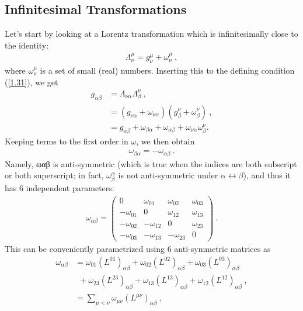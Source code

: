 \documentclass[12pt,a4paper]{report}
\begin{document}
\subsection{ Infinitesimal Transformations}
Let’s start by looking at a Lorentz transformation \cite{Hitoshi, Ryder} which is infinitesimally close to the
identity:
\begin{align}
    \Lambda^\mu_\nu=g^\mu_\nu+\omega^\mu_\nu\label{1.80}~,
\end{align}
where $\omega^\mu_\nu$ is a set of small (real) numbers. Inserting this to the defining condition (\eqref{1.31}), we get
\begin{align}
    g_{\alpha\beta}&=\Lambda_{\nu\alpha}\Lambda^\nu_\beta~,\\
    &=(g_{\nu\alpha}+\omega_{\nu\alpha})(g^\nu_\beta+\omega^\nu_\beta)~,\nonumber\\
    &=g_{\alpha\beta}+\omega_{\beta\alpha}+\omega_{\alpha\beta}+\omega_{\nu\alpha}\omega^\nu_\beta.
\end{align}
Keeping terms to the first order in $\omega$, we then obtain
\begin{align}
    \omega_{\beta\alpha}=-\omega_{\alpha\beta}~.
\end{align}
Namely, ωαβ is anti-symmetric (which is true when the indices are both subscript or both superscript; in fact, $\omega^\alpha_\beta$ is not anti-symmetric under $\alpha\longleftrightarrow\beta$), and thus it has 6
independent parameters:
\begin{align}
    \omega_{\alpha\beta}=\begin{pmatrix}
    0&\omega_{01}&\omega_{02}&\omega_{03}\\
    -\omega_{01}&0&\omega_{12}&\omega_{13}\\
    -\omega_{02}&-\omega_{12}&0&\omega_{23}\\
    -\omega_{03}&-\omega_{13}&-\omega_{23}&0
\end{pmatrix}~.
\end{align}
This can be conveniently parametrized using 6 anti-symmetric matrices as
\begin{align}
    \omega_{\alpha\beta}&=\omega_{01}(L^{01})_{\alpha\beta}+\omega_{02}(L^{02})_{\alpha\beta}+\omega_{03}(L^{03})_{\alpha\beta}\nonumber\\
    &~~+\omega_{23}(L^{23})_{\alpha\beta}+\omega_{13}(L^{13})_{\alpha\beta}+\omega_{12}(L^{12})_{\alpha\beta}~,\\
    &=\sum_{\mu<\nu}\omega_{\mu\nu}(L^{\mu\nu})_{\alpha\beta}\label{1.84}~,
\end{align}
\end{document}
